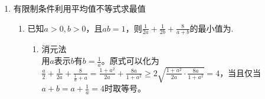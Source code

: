 \begin{enumerate}
\begin{enumerate}
\begin{jieda}
        \end{jieda}
        \item 已知两两不同的$x_1, y_1, x_2, y_2, x_3, y_3$满足$x_1 + y_1 = x_2 + y_2 = x_3 + y_3$，且$x_1 < y_1, \quad x_2 < y_2, \quad x_3 < y_3, \quad x_1y_1+x_3y_3=2x_2y_2 > 0$，则下列选项中恒成立的是 \dotfill()
        \begin{jieda}
            设$x_1+y_1 = 2m$，故可设$\left \{
    \begin{array}{lll}
         x_1 = m - a, & y_1 = m + a, & a > 0\\
         x_2 = m - b, & y_2 = m + b, & b > 0\\
         x_3 = m - c, & y_3 = m + c, & c > 0
    \end{array}
    \right.$  \\
    由此，题目中的条件可以转化为 $m^2 - a^2 + m^2 - c^2 = 2(m^2-b^2)$，即$a^2+c^2 = 2b^2$，且有$m^2 - b^2 > 0$。下面推导$a+c<2b$
    \begin{enumerate}
        \item 方法1：利用平方差公式 \\
        原式移项后可以进一步可以转化为$(a+b)(a-b) + (c+b)(c-b) = 0$。\\
        $(a+b)(a-b) + (c+b)(c-b) = 0$说明$a < b < c$或者$c < b < a$，不妨设$a < b < c$（另一种情况对称），此时必有$(a+b) < (c+b)$，因此有$|a-b| > |c-b|$，即$b-a > c-b$，故$a+c<2b$
        \item 方法2：利用平均值不等式 \\
        由平均值不等式有$\sqrt{\dfrac{a^2+c^2}{2}} > \dfrac{a+c}{2}$，根据$a^2+c^2 = 2b^2$，可以转化为$2b > a + c$
    \end{enumerate}
    \end{jieda} 
    \end{enumerate}
    \item 有限制条件利用平均值不等式求最值
    \begin{enumerate}
        \item 已知$a > 0, b > 0$，且$ab = 1$，则$\frac{1}{2a} + \frac{1}{2b} + \frac{8}{a+b}$的最小值为.
        \begin{jieda}
            \begin{enumerate}
                \item 消元法 \\
                用$a$表示$b$有$b = \frac{1}{a}$。原式可以化为$\frac{a}{2} + \frac{1}{2a} + \frac{8}{\frac{1}{a} + a} = \frac{1+a^2}{2a} + \frac{8a}{1+a^2} \geq 2\sqrt{\frac{1+a^2}{2a} \cdot \frac{8a}{1+a^2}} = 4$，当且仅当$a+b = a + \frac{1}{a} = 4$时取等号。 

\end{enumerate}
\end{jieda}
\end{enumerate}
\end{enumerate}
